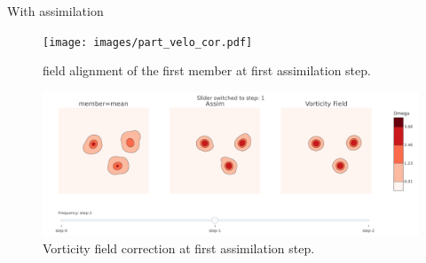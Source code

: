 \documentclass[aspectratio=169]{beamer} %
\begin{document}
\begin{frame}{With assimilation}
    \begin{figure}
        \centering
        \texttt{[image: images/part\_velo\_cor.pdf]}
        \caption*{field alignment of the first member at first assimilation step.}
    \end{figure}
    \begin{figure}
        \centering
        \includegraphics[width=\textwidth]{images/mean_vorticity.pdf}
        \caption*{Vorticity field correction at first assimilation step.}
    \end{figure}
\end{frame}
\end{document}
